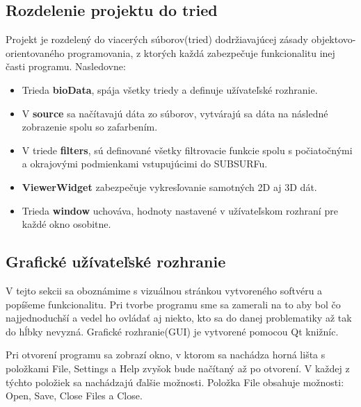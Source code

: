 \documentclass[a4paper,11pt,twoside]{article}%
\begin{document}
\subsection{Rozdelenie projektu do tried}

Projekt je rozdelený do viacerých súborov(tried) dodržiavajúcej zásady objektovo-orientovaného programovania, z ktorých každá zabezpečuje funkcionalitu inej časti programu. Nasledovne:

\begin{itemize}
\item Trieda \textbf{bioData}, spája všetky triedy a definuje užívateľské rozhranie.
\item V \textbf{source} sa načítavajú dáta zo súborov, vytvárajú sa dáta na následné zobrazenie spolu so zafarbením.   
\item V triede \textbf{filters}, sú definované všetky filtrovacie funkcie spolu s počiatočnými a okrajovými podmienkami vstupujúcimi do SUBSURFu.
\item \textbf{ViewerWidget} zabezpečuje vykresľovanie samotných 2D aj 3D dát.
\item Trieda \textbf{window} uchováva, hodnoty nastavené v užívateľskom rozhraní pre každé okno osobitne.

\end{itemize}


\subsection{Grafické užívateľské rozhranie}

V tejto sekcii sa oboznámime s vizuálnou stránkou vytvoreného softvéru a popíšeme funkcionalitu. Pri tvorbe programu sme sa zamerali na to aby bol čo najjednoduchší a vedel ho ovládať aj niekto, kto sa do danej problematiky až tak do hĺbky nevyzná. Grafické rozhranie(GUI) je vytvorené pomocou Qt knižníc.

Pri otvorení programu sa zobrazí okno, v ktorom sa nachádza horná lišta s položkami File, Settings a Help zvyšok bude načítaný až po otvorení. V každej z týchto položiek sa nachádzajú ďalšie možnosti. Položka File obsahuje možnosti: Open, Save, Close Files a Close.
\end{document}
